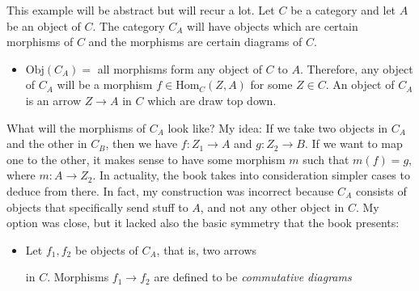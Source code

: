\documentclass{report}
\begin{document}
\begin{examples}
    \begin{example}[\label{exm:1.3.5}]
        This example will be abstract but will recur a lot. Let $C$ be a category and let $A$ be an object of $C$. The category $C_{A}$ will have objects which are certain morphisms of $C$ and the morphisms are certain diagrams of $C$.
            \begin{itemize}
                \item $\text{Obj}(C_{A}) = $ all morphisms form any object of $C$ to $A$. Therefore, any object of $C_{A}$ will be a morphism $f \in \text{Hom}_{C}(Z, A)$ for some $Z \in C$. An object of $C_{A}$ is an arrow $Z \rightarrow A$ in $C$ which are draw top down. 
                    \begin{center}
                    \end{center}
            \end{itemize}
            What will the morphisms of $C_{A}$ look like? My idea: If we take two objects in $C_{A}$ and the other in $C_{B}$, then we have $f : Z_{1} \rightarrow A$ and $g : Z_{2} \rightarrow B$. If we want to map one to the other, it makes sense to have some morphism $m$ such that $m(f) = g$, where $m : A \rightarrow Z_{2}$. In actuality, the book takes into consideration simpler cases to deduce from there. In fact, my construction was incorrect because $C_{A}$ consists of objects that specifically send stuff to $A$, and not any other object in $C$. My option was close, but it lacked also the basic symmetry that the book presents:
            \begin{itemize}
                \item Let $f_{1}, f_{2}$ be objects of $C_{A}$, that is, two arrows
                \begin{center}
                \end{center}
                in $C$. Morphisms $f_{1} \rightarrow f_{2}$ are defined to be \textit{commutative diagrams}

\end{itemize}
\end{example}
\end{examples}
\end{document}
